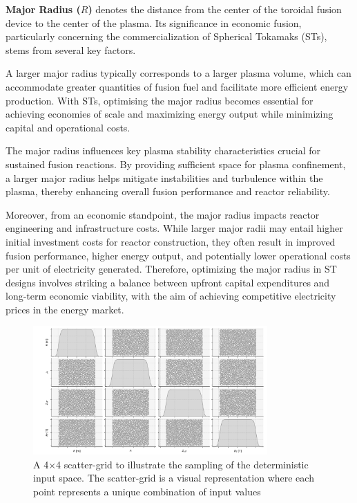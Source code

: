 \documentclass[journal]{IEEEtran}
\begin{document}
\textbf{Major Radius ($R$)} denotes the distance from the center of the toroidal fusion device to the center of the plasma. Its significance in economic fusion, particularly concerning the commercialization of Spherical Tokamaks (STs), stems from several key factors.

A larger major radius typically corresponds to a larger plasma volume, which can accommodate greater quantities of fusion fuel and facilitate more efficient energy production. With STs, optimising the major radius becomes essential for achieving economies of scale and maximizing energy output while minimizing capital and operational costs.

The major radius influences key plasma stability characteristics crucial for sustained fusion reactions. By providing sufficient space for plasma confinement, a larger major radius helps mitigate instabilities and turbulence within the plasma, thereby enhancing overall fusion performance and reactor reliability.

Moreover, from an economic standpoint, the major radius impacts reactor engineering and infrastructure costs. While larger major radii may entail higher initial investment costs for reactor construction, they often result in improved fusion performance, higher energy output, and potentially lower operational costs per unit of electricity generated. Therefore, optimizing the major radius in ST designs involves striking a balance between upfront capital expenditures and long-term economic viability, with the aim of achieving competitive electricity prices in the energy market.

\begin{figure}[t]
    \centering
    \includegraphics[width=0.8\textwidth]{figures/TE_results/4x4scatter_inputs_marchdata.png}
    \caption{\small A 4$\times$4 scatter-grid to illustrate the sampling of the deterministic input space. The scatter-grid is a visual representation where each point represents a unique combination of input values}\label{fig:scatter_sampling}
\end{figure}
\end{document}
